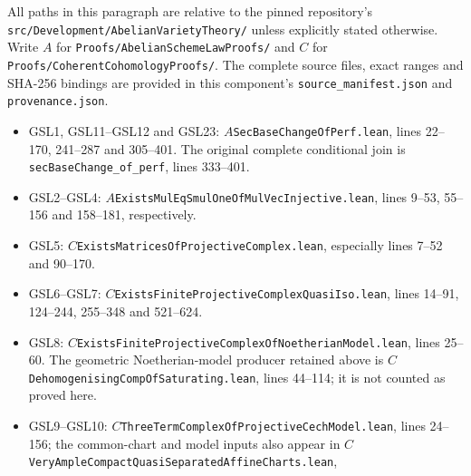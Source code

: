 \documentclass[11pt,a4paper]{article}
\numberwithin{equation}{section}
\theoremstyle{remark}\newtheorem{remark}[theorem]{Remark}
\begin{document}
{\small\raggedright
All paths in this paragraph are relative to the pinned repository's
\texttt{src/\allowbreak Development/\allowbreak Abelian\allowbreak Variety\allowbreak Theory/\allowbreak } unless explicitly
stated otherwise.  Write $A$ for
\texttt{Proofs/\allowbreak Abelian\allowbreak Scheme\allowbreak Law\allowbreak Proofs/\allowbreak } and $C$ for
\texttt{Proofs/\allowbreak Coherent\allowbreak Cohomology\allowbreak Proofs/\allowbreak }.  The complete source files,
exact ranges and SHA-256 bindings are provided in this component's
\texttt{source\_\allowbreak manifest.\allowbreak json} and \texttt{provenance.\allowbreak json}.

\begin{itemize}
 \item GSL1, GSL11--GSL12 and GSL23:
 $A$\texttt{Sec\allowbreak Base\allowbreak Change\allowbreak Of\allowbreak Perf.\allowbreak lean}, lines 22--170,
 241--287 and 305--401.  The original complete conditional
 join is \texttt{sec\allowbreak Base\allowbreak Change\_\allowbreak of\_\allowbreak perf}, lines 333--401.
 \item GSL2--GSL4:
 $A$\texttt{Exists\allowbreak Mul\allowbreak Eq\allowbreak Smul\allowbreak One\allowbreak Of\allowbreak Mul\allowbreak Vec\allowbreak Injective.\allowbreak lean},
 lines 9--53, 55--156 and 158--181, respectively.
 \item GSL5:
 $C$\texttt{Exists\allowbreak Matrices\allowbreak Of\allowbreak Projective\allowbreak Complex.\allowbreak lean},
 especially lines 7--52 and 90--170.
 \item GSL6--GSL7:
 $C$\texttt{Exists\allowbreak Finite\allowbreak Projective\allowbreak Complex\allowbreak Quasi\allowbreak Iso.\allowbreak lean},
 lines 14--91, 124--244, 255--348 and 521--624.
 \item GSL8:
 $C$\texttt{Exists\allowbreak Finite\allowbreak Projective\allowbreak Complex\allowbreak Of\allowbreak Noetherian\allowbreak Model.\allowbreak lean},
 lines 25--60.  The geometric Noetherian-model producer retained
 above is $C$\texttt{Dehomogenising\allowbreak Comp\allowbreak Of\allowbreak Saturating.\allowbreak lean},
 lines 44--114; it is not counted as proved here.
 \item GSL9--GSL10:
 $C$\texttt{Three\allowbreak Term\allowbreak Complex\allowbreak Of\allowbreak Projective\allowbreak Cech\allowbreak Model.\allowbreak lean},
 lines 24--156; the common-chart and model inputs also appear in
 $C$\texttt{Very\allowbreak Ample\allowbreak Compact\allowbreak Quasi\allowbreak Separated\allowbreak Affine\allowbreak Charts.\allowbreak lean},

\end{itemize}}
\end{document}
